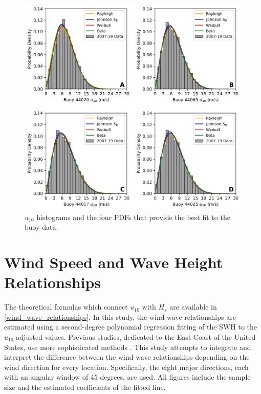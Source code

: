 \begin{figure}[H]
\centering
\includegraphics[width=0.95\linewidth]{Figures/Chapter5/wind_pdfs_loc1.png}
\caption{$u_{10}$ histograms and the four PDFs that provide the best fit to the buoy data.}
\label{fig:pdfs_wind}
\end{figure}





\pagebreak

\section{Wind Speed and Wave Height Relationships}

The theoretical formulas which connect $u_{10}$ with $H_{s}$ are available in \ref{wind_wave_relationships}. In this study, the wind-wave relationships are estimated using a second-degree polynomial regression fitting of the SWH to the $u_{10}$ adjusted values. Previous studies, dedicated to the East Coast of the United States, use more sophisticated methods \cite{Andreas2007}. This study attempts to integrate and interpret the difference between the wind-wave relationships depending on the wind direction for every location. Specifically, the eight major directions, each with an angular window of 45 degrees, are used. All figures include the sample size and the estimated coefficients of the fitted line. 



